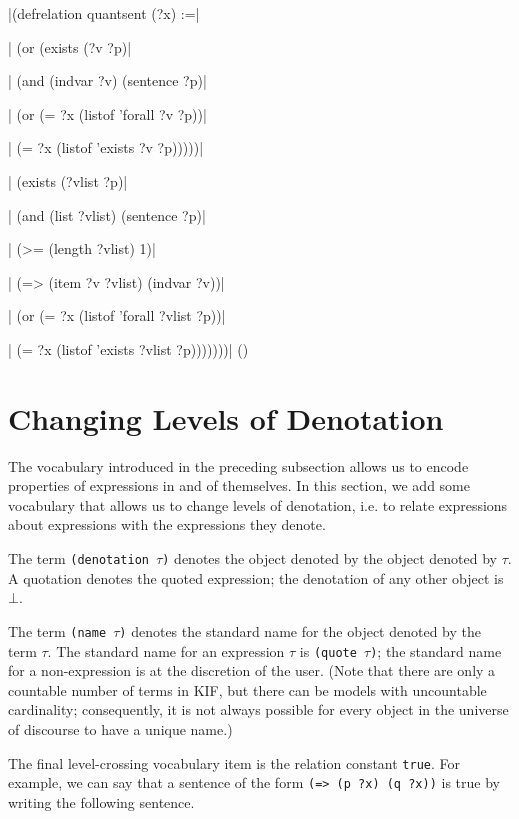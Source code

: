 \medskip
\verbatim|(defrelation quantsent (?x) :=|\par
\verbatim|  (or (exists (?v ?p)|\par
\verbatim|        (and (indvar ?v) (sentence ?p)|\par
\verbatim|             (or (= ?x (listof 'forall ?v ?p))|\par
\verbatim|                 (= ?x (listof 'exists ?v ?p)))))|\par
\verbatim|      (exists (?vlist ?p)|\par
\verbatim|        (and (list ?vlist) (sentence ?p)|\par
\verbatim|             (>= (length ?vlist) 1)|\par
\verbatim|             (=> (item ?v ?vlist) (indvar ?v))|\par
\verbatim|             (or (= ?x (listof 'forall ?vlist ?p))|\par
\verbatim|                 (= ?x (listof 'exists ?vlist ?p)))))))|
\hfill(\equation)\par
\medskip

\section{Changing Levels of Denotation}

The vocabulary introduced in the preceding subsection allows us to encode
properties of expressions in and of themselves.  In this section, we add some
vocabulary that allows us to change levels of denotation, i.e. to relate
expressions about expressions with the expressions they denote.

The term {\tt (denotation $\tau$)} denotes the object denoted by the object
denoted by $\tau$.  A quotation denotes the quoted expression; the denotation
of any other object is $\bot$.

The term {\tt (name $\tau$)} denotes the standard name for the object denoted
by the term $\tau$.  The standard name for an expression $\tau$ is
{\tt (quote $\tau$)}; the standard name for a non-expression is at the
discretion of the user.  (Note that there are only a countable number of
terms in KIF, but there can be models with uncountable cardinality;
consequently, it is not always possible for every object in the universe of
discourse to have a unique name.)

The final level-crossing vocabulary item is the relation constant {\tt true}. 
For example, we can say that a sentence of the form {\tt (=> (p ?x) (q ?x))}
is true by writing the following sentence.


